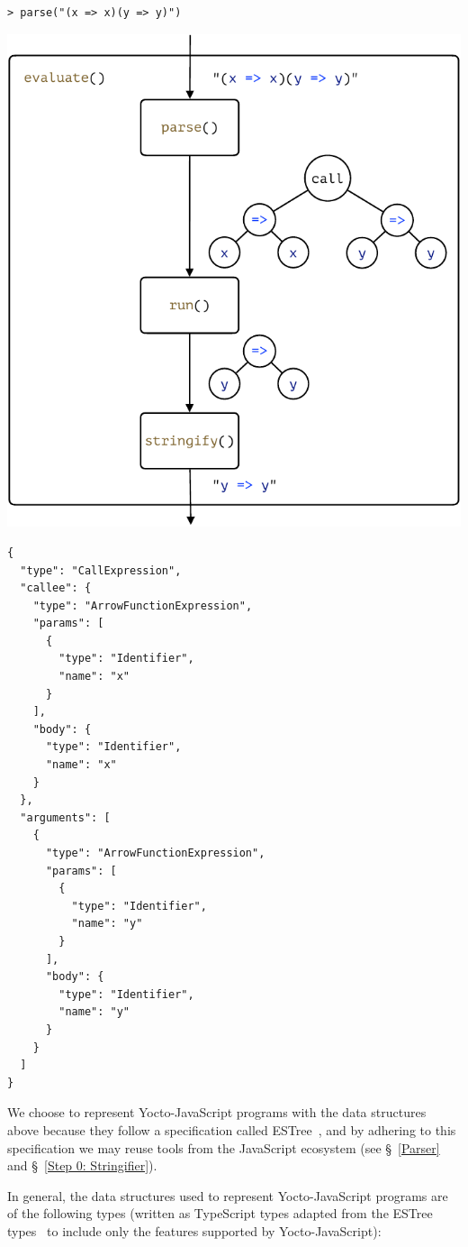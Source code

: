 \documentclass[12pt, oneside]{book}
\begin{document}
\begin{verbatim}
> parse("(x => x)(y => y)")
\end{verbatim}
\includegraphics[page = 3]{images.pdf}
\begin{verbatim}
{
  "type": "CallExpression",
  "callee": {
    "type": "ArrowFunctionExpression",
    "params": [
      {
        "type": "Identifier",
        "name": "x"
      }
    ],
    "body": {
      "type": "Identifier",
      "name": "x"
    }
  },
  "arguments": [
    {
      "type": "ArrowFunctionExpression",
      "params": [
        {
          "type": "Identifier",
          "name": "y"
        }
      ],
      "body": {
        "type": "Identifier",
        "name": "y"
      }
    }
  ]
}
\end{verbatim}

We choose to represent Yocto-JavaScript programs with the data structures above because they follow a specification called ESTree~\cite{estree}, and by adhering to this specification we may reuse tools from the JavaScript ecosystem (see §~\ref{Parser} and §~\ref{Step 0: Stringifier}).

In general, the data structures used to represent Yocto-JavaScript programs are of the following types (written as TypeScript types adapted from the ESTree types~\cite{estree-types} to include only the features supported by Yocto-JavaScript):
\end{document}
